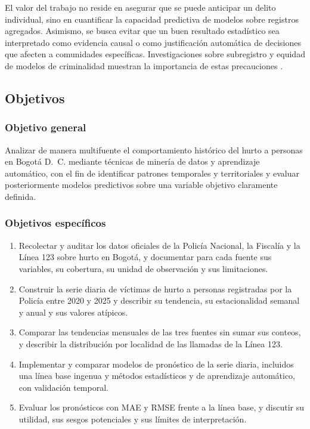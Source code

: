 \documentclass[12pt,letterpaper]{article}
\begin{document}
El valor del trabajo no reside en asegurar que se puede anticipar un delito individual, sino en cuantificar la capacidad predictiva de modelos sobre registros agregados. Asimismo, se busca evitar que un buen resultado estadístico sea interpretado como evidencia causal o como justificación automática de decisiones que afecten a comunidades específicas. Investigaciones sobre subregistro y equidad de modelos de criminalidad muestran la importancia de estas precauciones \citep{riascos2023,urcuqui2020}.

\subsection{Objetivos}

\subsubsection{Objetivo general}

Analizar de manera multifuente el comportamiento histórico del hurto a personas en Bogotá D.~C. mediante técnicas de minería de datos y aprendizaje automático, con el fin de identificar patrones temporales y territoriales y evaluar posteriormente modelos predictivos sobre una variable objetivo claramente definida.

\subsubsection{Objetivos específicos}

\begin{enumerate}
  \item Recolectar y auditar los datos oficiales de la Policía Nacional, la Fiscalía y la Línea 123 sobre hurto en Bogotá, y documentar para cada fuente sus variables, su cobertura, su unidad de observación y sus limitaciones.
  \item Construir la serie diaria de víctimas de hurto a personas registradas por la Policía entre 2020 y 2025 y describir su tendencia, su estacionalidad semanal y anual y sus valores atípicos.
  \item Comparar las tendencias mensuales de las tres fuentes sin sumar sus conteos, y describir la distribución por localidad de las llamadas de la Línea 123.
  \item Implementar y comparar modelos de pronóstico de la serie diaria, incluidos una línea base ingenua y métodos estadísticos y de aprendizaje automático, con validación temporal.
  \item Evaluar los pronósticos con MAE y RMSE frente a la línea base, y discutir su utilidad, sus sesgos potenciales y sus límites de interpretación.
\end{enumerate}
\end{document}
